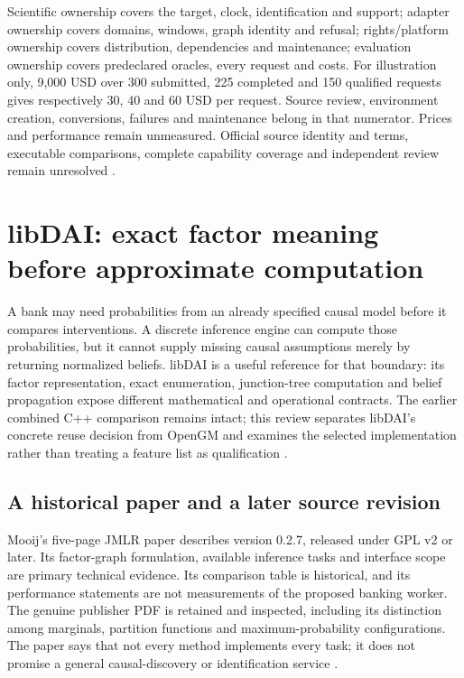Scientific ownership covers the target, clock, identification and support;
adapter ownership covers domains, windows, graph identity and refusal;
rights/platform ownership covers distribution, dependencies and maintenance;
evaluation ownership covers predeclared oracles, every request and costs.
For illustration only, 9,000 USD over 300 submitted, 225 completed and
150 qualified requests gives respectively 30, 40 and 60 USD per request.
Source review, environment creation, conversions, failures and maintenance
belong in that numerator. Prices and performance remain unmeasured.
Official source identity and terms, executable comparisons, complete capability coverage and independent review remain unresolved
\citep{exec24_banjo_choice}.


\section{libDAI: exact factor meaning before approximate computation}
\label{sec:exec24-libdai-reuse}

A bank may need probabilities from an already specified causal model before
it compares interventions. A discrete inference engine can compute those
probabilities, but it cannot supply missing causal assumptions merely by
returning normalized beliefs. libDAI is a useful reference for that boundary:
its factor representation, exact enumeration, junction-tree computation and
belief propagation expose different mathematical and operational contracts.
The earlier combined C++ comparison remains intact; this review separates
libDAI's concrete reuse decision from OpenGM and examines the selected
implementation rather than treating a feature list as qualification
\citep{exec13_cxx_inference,exec24_libdai_source}.

\subsection{A historical paper and a later source revision}
Mooij's five-page JMLR paper describes version 0.2.7, released under GPL v2 or
later. Its factor-graph formulation, available inference tasks and interface
scope are primary technical evidence. Its comparison table is historical,
and its performance statements are not measurements of the proposed banking
worker. The genuine publisher PDF is retained and inspected, including its
distinction among marginals, partition functions and maximum-probability
configurations. The paper says that not every method implements every task;
it does not promise a general causal-discovery or identification service
\citep{exec24_libdai_paper}.


